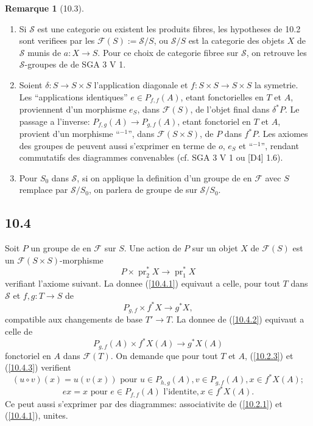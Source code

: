 \documentclass[12pt,a4paper]{article}
\theoremstyle{plain}
\theoremstyle{definition}
\newtheorem{remark}[theorem]{Remarque}
\theoremstyle{remark}
\DeclareMathOperator{\pr}{pr}
\begin{document}
\begin{remark}[10.3]
\leavevmode
\begin{enumerate}[label=(\roman*)]
\item Si $\mathcal{S}$ est une categorie ou existent les produits fibres, les hypotheses de 10.2 sont verifiees par les $\mathcal{F}(S) := \mathcal{S}/S$, ou $\mathcal{S}/S$ est la categorie des objets $X$ de $\mathcal{S}$ munis de $a: X \to S$. Pour ce choix de categorie fibree sur $\mathcal{S}$, on retrouve les $\mathcal{S}$-groupes de de SGA 3 V 1.

\item Soient $\delta: S \to S \times S$ l'application diagonale et $f: S \times S \to S \times S$ la symetrie. Les ``applications identiques'' $e \in P_{f,f}(A)$, etant fonctorielles en $T$ et $A$, proviennent d'un morphisme $e_S$, dans $\mathcal{F}(S)$, de l'objet final dans $\delta^* P$. Le passage a l'inverse: $P_{f,g}(A) \to P_{g,f}(A)$, etant fonctoriel en $T$ et $A$, provient d'un morphisme ``${}^{-1}$'', dans $\mathcal{F}(S \times S)$, de $P$ dans $f^* P$. Les axiomes des groupes de peuvent aussi s'exprimer en terme de $o$, $e_S$ et ``${}^{-1}$'', rendant commutatifs des diagrammes convenables (cf. SGA 3 V 1 ou [D4] 1.6).

\item Pour $S_0$ dans $\mathcal{S}$, si on applique la definition d'un groupe de en $\mathcal{F}$ avec $S$ remplace par $\mathcal{S}/S_0$, on parlera de groupe de sur $\mathcal{S}/S_0$.
\end{enumerate}
\end{remark}

\subsection*{10.4}

Soit $P$ un groupe de en $\mathcal{F}$ sur $S$. Une action de $P$ sur un objet $X$ de $\mathcal{F}(S)$ est un $\mathcal{F}(S \times S)$-morphisme
\begin{equation}\label{10.4.1}
P \times \pr_2^* X \longrightarrow \pr_1^* X \tag{10.4.1}
\end{equation}
verifiant l'axiome suivant. La donnee (\ref{10.4.1}) equivaut a celle, pour tout $T$ dans $\mathcal{S}$ et $f, g: T \to S$ de
\begin{equation}\label{10.4.2}
P_{g,f} \times f^* X \longrightarrow g^* X, \tag{10.4.2}
\end{equation}
compatible aux changements de base $T' \to T$. La donnee de (\ref{10.4.2}) equivaut a celle de
\begin{equation}\label{10.4.3}
P_{g,f}(A) \times f^* X(A) \longrightarrow g^* X(A) \tag{10.4.3}
\end{equation}
fonctoriel en $A$ dans $\mathcal{F}(T)$. On demande que pour tout $T$ et $A$, (\ref{10.2.3}) et (\ref{10.4.3}) verifient
$$(u \circ v)(x) = u(v(x)) \text{ pour } u \in P_{h,g}(A), v \in P_{g,f}(A), x \in f^* X(A);$$
$$ex = x \text{ pour } e \in P_{f,f}(A) \text{ l'identite}, x \in f^* X(A).$$
Ce peut aussi s'exprimer par des diagrammes: associativite de (\ref{10.2.1}) et (\ref{10.4.1}), unites.
\end{document}
